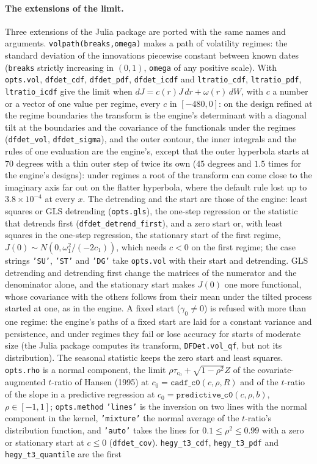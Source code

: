\documentclass[11pt]{article}
\newcommand{\code}[1]{\texttt{#1}}
\begin{document}
\paragraph{The extensions of the limit.}  Three extensions of the Julia package are ported with the same names and arguments.  \code{volpath(breaks,omega)} makes a path of volatility regimes: the standard deviation of the innovations piecewise constant between known dates (\code{breaks} strictly increasing in $(0,1)$, \code{omega} of any positive scale).  With \code{opts.vol}, \code{dfdet\_cdf}, \code{dfdet\_pdf}, \code{dfdet\_icdf} and \code{ltratio\_cdf}, \code{ltratio\_pdf}, \code{ltratio\_icdf} give the limit when $dJ=c(r)J\,dr+\omega(r)\,dW$, with $c$ a number or a vector of one value per regime, every $c$ in $[-480,0]$: on the design refined at the regime boundaries the transform is the engine's determinant with a diagonal tilt at the boundaries and the covariance of the functionals under the regimes (\code{dfdet\_vol}, \code{dfdet\_sigma}), and the outer contour, the inner integrals and the rules of one evaluation are the engine's, except that the outer hyperbola starts at $70$ degrees with a thin outer step of twice its own ($45$ degrees and $1.5$ times for the engine's designs): under regimes a root of the transform can come close to the imaginary axis far out on the flatter hyperbola, where the default rule lost up to $3.8\times10^{-4}$ at every $x$.  The detrending and the start are those of the engine: least squares or GLS detrending (\code{opts.gls}), the one-step regression or the statistic that detrends first (\code{dfdet\_detrend\_first}), and a zero start or, with least squares in the one-step regression, the stationary start of the first regime, $J(0)\sim N(0,\omega_1^2/(-2c_1))$, which needs $c<0$ on the first regime; the case strings \code{'SU'}, \code{'ST'} and \code{'DG'} take \code{opts.vol} with their start and detrending.  GLS detrending and detrending first change the matrices of the numerator and the denominator alone, and the stationary start makes $J(0)$ one more functional, whose covariance with the others follows from their mean under the tilted process started at one, as in the engine.  A fixed start ($\gamma_0\ne0$) is refused with more than one regime: the engine's paths of a fixed start are laid for a constant variance and persistence, and under regimes they fail or lose accuracy for starts of moderate size (the Julia package computes its transform, \code{DFDet.vol\_qf}, but not its distribution).  The seasonal statistic keeps the zero start and least squares.  \code{opts.rho} is a normal component, the limit $\rho\tau_{c_0}+\sqrt{1-\rho^2}Z$ of the covariate-augmented $t$-ratio of Hansen (1995) at $c_0=\code{cadf\_c0}(c,\rho,R)$ and of the $t$-ratio of the slope in a predictive regression at $c_0=\code{predictive\_c0}(c,\rho,b)$, $\rho\in[-1,1]$; \code{opts.method} \code{'lines'} is the inversion on two lines with the normal component in the kernel, \code{'mixture'} the normal average of the $t$-ratio's distribution function, and \code{'auto'} takes the lines for $0.1\le\rho^2\le0.99$ with a zero or stationary start at $c\le0$ (\code{dfdet\_cov}).  \code{hegy\_t3\_cdf}, \code{hegy\_t3\_pdf} and \code{hegy\_t3\_quantile} are the first 
\end{document}
